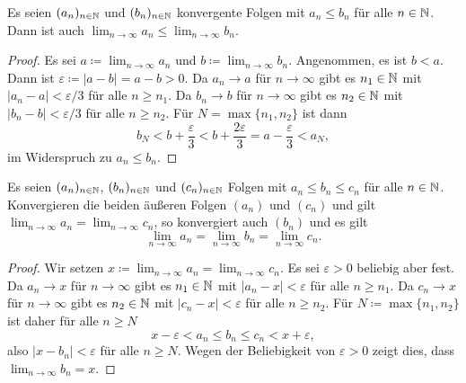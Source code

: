 \documentclass[a4paper,10pt]{article}
\begin{document}
\begin{lem}
 Es seien $(a_n)_{n \in \mathbb{N}}$ und $(b_n)_{n \in \mathbb{N}}$ konvergente Folgen mit $a_n \leq b_n$ für alle $n \in \mathbb{N}$. Dann ist auch $\lim_{n \to \infty} a_n \leq \lim_{n \to \infty} b_n$.
\end{lem}
\begin{proof}
 Es sei $a \coloneqq \lim_{n \to \infty} a_n$ und $b \coloneqq \lim_{n \to \infty} b_n$. Angenommen, es ist $b < a$. Dann ist $\varepsilon \coloneqq |a-b| = a-b > 0$. Da $a_n \to a$ für $n \to \infty$ gibt es $n_1 \in \mathbb{N}$ mit $|a_n - a| < \varepsilon/3$ für alle $n \geq n_1$. Da $b_n \to b$ für $n \to \infty$ gibt es $n_2 \in \mathbb{N}$ mit $|b_n - b| < \varepsilon/3$ für alle $n \geq n_2$. Für $N = \max \{n_1, n_2\}$ ist dann
 \[
  b_N < b + \frac{\varepsilon}{3} < b + \frac{2\varepsilon}{3} = a - \frac{\varepsilon}{3} < a_N,
 \]
 im Widerspruch zu $a_n \leq b_n$.
\end{proof}


\begin{lem}
 Es seien $(a_n)_{n \in \mathbb{N}}$, $(b_n)_{n \in \mathbb{N}}$ und $(c_n)_{n \in \mathbb{N}}$ Folgen mit $a_n \leq b_n \leq c_n$ für alle $n \in \mathbb{N}$. Konvergieren die beiden äußeren Folgen $(a_n)$ und $(c_n)$ und gilt $\lim_{n \to \infty} a_n = \lim_{n \to \infty} c_n$, so konvergiert auch $(b_n)$ und es gilt
 \[
  \lim_{n \to \infty} a_n = \lim_{n \to \infty} b_n = \lim_{n \to \infty} c_n.
 \]
\end{lem}
\begin{proof}
 Wir setzen $x \coloneqq \lim_{n \to \infty} a_n = \lim_{n \to \infty} c_n$. Es sei $\varepsilon > 0$ beliebig aber fest. Da $a_n \to x$ für $n \to \infty$ gibt es $n_1 \in \mathbb{N}$ mit $|a_n - x| < \varepsilon$ für alle $n \geq n_1$. Da $c_n \to x$ für $n \to \infty$ gibt es $n_2 \in \mathbb{N}$ mit $|c_n - x| < \varepsilon$ für alle $n \geq n_2$. Für $N \coloneqq \max \{n_1, n_2\}$ ist daher für alle $n \geq N$
 \[
  x-\varepsilon < a_n \leq b_n \leq c_n < x+\varepsilon,
 \]
 also $|x - b_n| < \varepsilon$ für alle $n \geq N$. Wegen der Beliebigkeit von $\varepsilon > 0$ zeigt dies, dass $\lim_{n \to \infty} b_n = x$.
\end{proof}
\end{document}
